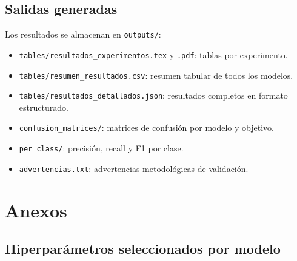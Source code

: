 \documentclass[conference]{IEEEtran}
\begin{document}
\subsection{Salidas generadas}
Los resultados se almacenan en \texttt{outputs/}:
\begin{itemize}
  \item \texttt{tables/resultados\_experimentos.tex} y \texttt{.pdf}: tablas por experimento.
  \item \texttt{tables/resumen\_resultados.csv}: resumen tabular de todos los modelos.
  \item \texttt{tables/resultados\_detallados.json}: resultados completos en formato estructurado.
  \item \texttt{confusion\_matrices/}: matrices de confusión por modelo y objetivo.
  \item \texttt{per\_class/}: precisión, recall y F1 por clase.
  \item \texttt{advertencias.txt}: advertencias metodológicas de validación.
\end{itemize}

\appendices

\section{Anexos}

\subsection{Hiperparámetros seleccionados por modelo}
\end{document}
